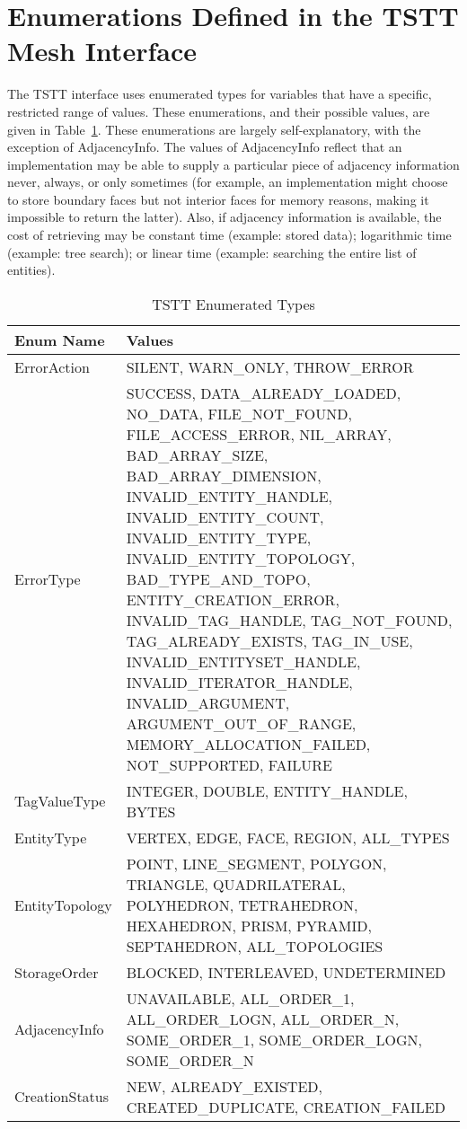\appendix
\section{Enumerations Defined in the TSTT Mesh
Interface}\label{app:TSTT-enum}
The TSTT interface uses enumerated types for variables that have a
specific, restricted range of values.  These enumerations, and their
possible values, are given in Table~\ref{table:Enums}.  These
enumerations are largely self-explanatory, with the exception of
AdjacencyInfo.  The values of AdjacencyInfo reflect that an
implementation may be able to supply a particular piece of adjacency
information never, always, or only sometimes (for example, an
implementation might choose to store boundary faces but not interior
faces for memory reasons, making it impossible to return the
latter). Also, if adjacency information is available, the cost of
retrieving may be constant time (example: stored data); logarithmic time
(example: tree search); or linear time (example: searching the entire
list of entities).
\begin{table}[htp]
\caption{TSTT Enumerated Types}\label{table:Enums}
{\small
\begin{tabular}{|l|p{5in}|}
\hline 
Enum Name&
Values\tabularnewline
\hline
\hline 
ErrorAction&
SILENT, WARN\_ONLY, THROW\_ERROR\tabularnewline
\hline 
ErrorType&
\raggedright SUCCESS, DATA\_ALREADY\_LOADED, NO\_DATA, FILE\_NOT\_FOUND,
FILE\_ACCESS\_ERROR, NIL\_ARRAY, BAD\_ARRAY\_SIZE, BAD\_ARRAY\_DIMENSION,
INVALID\_ENTITY\_HANDLE, INVALID\_ENTITY\_COUNT, INVALID\_ENTITY\_TYPE,
INVALID\_ENTITY\_TOPOLOGY, BAD\_TYPE\_AND\_TOPO, ENTITY\_CREATION\_ERROR,
INVALID\_TAG\_HANDLE, TAG\_NOT\_FOUND, TAG\_ALREADY\_EXISTS, TAG\_IN\_USE,
INVALID\_ENTITYSET\_HANDLE, INVALID\_ITERATOR\_HANDLE,
INVALID\_ARGUMENT, ARGUMENT\_OUT\_OF\_RANGE, MEMORY\_ALLOCATION\_FAILED, 
NOT\_SUPPORTED, FAILURE \tabularnewline
\hline 
TagValueType&
\raggedright INTEGER, DOUBLE, ENTITY\_HANDLE, BYTES\tabularnewline
\hline
EntityType&
\raggedright VERTEX, EDGE, FACE, REGION, ALL\_TYPES\tabularnewline
\hline 
EntityTopology&
\raggedright POINT, LINE\_SEGMENT, POLYGON, TRIANGLE, QUADRILATERAL, POLYHEDRON,
TETRAHEDRON, HEXAHEDRON, PRISM, PYRAMID, SEPTAHEDRON, ALL\_TOPOLOGIES\tabularnewline
\hline 
StorageOrder&
\raggedright BLOCKED, INTERLEAVED, UNDETERMINED\tabularnewline
\hline 
AdjacencyInfo&
\raggedright UNAVAILABLE, ALL\_ORDER\_1, ALL\_ORDER\_LOGN, ALL\_ORDER\_N, SOME\_ORDER\_1,
SOME\_ORDER\_LOGN, SOME\_ORDER\_N\tabularnewline
\hline 
CreationStatus&
\raggedright NEW, ALREADY\_EXISTED, CREATED\_DUPLICATE, CREATION\_FAILED\tabularnewline
\hline
\end{tabular}
}
\end{table}

